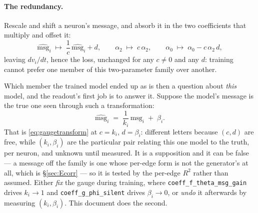 \documentclass[11pt,a4paper]{article}
\newcommand{\vi}{v_i}
\newcommand{\msg}{\mathrm{msg}}
\begin{document}
\paragraph{The redundancy.} Rescale and shift a neuron's message, and absorb it
in the two coefficients that multiply and offset it:
%
\begin{equation}
\widehat{\msg}_i \;\longmapsto\; \frac{1}{c}\,\widehat{\msg}_i + d,
\qquad
\alpha_2 \;\longmapsto\; c\,\alpha_2,
\qquad
\alpha_0 \;\longmapsto\; \alpha_0 - c\,\alpha_2\,d ,
\label{eq:gaugetransform}
\end{equation}
%
leaving $d\vi/dt$, hence the loss, unchanged for any $c \ne 0$ and any $d$:
training cannot prefer one member of this two-parameter family over another.

Which member the trained model ended up as is then a question about \emph{this}
model, and the readout's first job is to answer it. Suppose the model's message
is the true one seen through such a transformation:
%
\begin{equation}
\widehat{\msg}_i \;=\; \frac{1}{k_i}\,\msg_i \;+\; \beta_i .
\label{eq:ansatz}
\end{equation}
%
That is \eqref{eq:gaugetransform} at $c = k_i$, $d = \beta_i$: different letters
because $(c, d)$ are free, while $(k_i, \beta_i)$ are the particular pair
relating this one model to the truth, per neuron, and unknown until measured.
It is a supposition and it can be false --- a message off the family is one whose
per-edge form is not the generator's at all, which is \S\ref{sec:Ecorr} --- so it
is tested by the per-edge $R^2$ rather than assumed. Either \emph{fix} the gauge
during training, where \texttt{coeff\_f\_theta\_msg\_gain} drives $k_i \to 1$ and
\texttt{coeff\_g\_phi\_silent} drives $\beta_i \to 0$, or \emph{undo} it
afterwards by measuring $(k_i, \beta_i)$. This document does the second.
\end{document}
